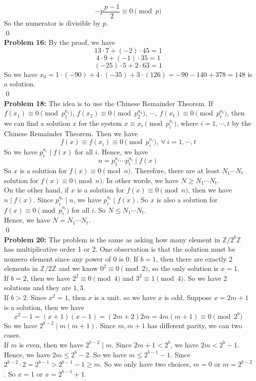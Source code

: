 \documentclass[12pt]{amsart}
\newcommand{\Z}{\mathbb{Z}}
\begin{document}
\[-p\frac{p-1}{2}\equiv 0\pmod p\]
So the numerator is divisible by $p$.
\\\qed\\
\textbf{Problem 16:} By the proof, we have 
\[13\cdot 7+(-2)\cdot 45=1\]
\[4\cdot 9+(-1)\cdot 35=1\]
\[(-25)\cdot 5+2\cdot 63=1\]
So we have $x_0=1\cdot (-90)+4\cdot (-35)+3\cdot (126)=-90-140+378=148$ is a solution.
\\\qed\\
\textbf{Problem 18:} The idea is to use the Chinese Remainder Theorem. If $f(x_1)\equiv 0\pmod{p_1^{a_1}}$, $f(x_2)\equiv 0\pmod{p_2^{a_2}}$, $\cdots, \ f(x_t)\equiv 0\pmod{p_t^{a_t}}$, then we can find a solution $x$ for the system $x\equiv x_i\pmod{p_i^{a_i}}$, where $i=1,\cdots, t$ by the Chinese Remainder Theorem. Then we have 
\[f(x)\equiv f(x_i)\equiv 0\pmod{p_i^{a_i}}, \ \forall\  i=1,\cdots,t \]
So we have $p_i^{a_i}\mid f(x)$ for all $i$. Hence, we have 
\[n=p_1^{a_1}\cdots p_t^{a_t}\mid f(x)\]
So $x$ is a solution for $f(x)\equiv 0\pmod n$. Therefore, there are at least $N_1\cdots N_t$ solution for $f(x)\equiv0\pmod n$. In other words, we have $N\geq N_1\cdots N_t$.\\
On the other hand, if $x$ is a solution for $f(x)\equiv 0\pmod n$, then we have $n\mid f(x)$. Since $p_i^{a_i}\mid n$, we have $p_i^{a_i}\mid f(x)$. So $x$ is also a solution for $f(x)\equiv 0\pmod{p_i^{a_i}}$ for all $i$. So $N\leq N_1\cdots N_t$.\\
Hence, we have $N=N_1\cdots N_t$.
\\\qed\\
\textbf{Problem 20:} The problem is the same as asking how many element in $\Z/2^b\Z$ has multiplicative order 1 or 2. One observation is that the solution must be nonzero element since any power of 0 is 0. If $b=1$, then there are exactly 2 elements in $\Z/2\Z$ and we know $0^2\equiv 0\pmod 2$, so the only solution is $x=1$.\\
If $b=2$, then we have $2^2\equiv 0\pmod 4$ and $3^2\equiv 1\pmod 4$. So we have 2 solutions and they are $1,3$.\\
If $b>2$. Since $x^2=1$, then $x$ is a unit. so we have $x$ is odd. Suppose $x=2m+1$ is a solution, then we have 
\[x^2-1=(x+1)(x-1)=(2m+2)2m=4m(m+1)\equiv 0\pmod{2^b}\]
So we have $2^{b-2}\mid m(m+1)$. Since $m,m+1$ has different parity, we can two cases.\\
If $m$ is even, then we have $2^{b-2}\mid m$. Since $2m+1<2^b$, we have 
$2m<2^b-1$. Hence, we have $2m\leq 2^b-2$. So we have $m\leq 2^{b-1}-1$. Since $2^{b-2}\cdot 2=2^{b-1}>2^{b-1}-1\geq m$. So we only have two choices, $m=0$ or $m=2^{b-2}$. So $x=1$ or $x=2^{b-1}+1$.\\
\end{document}
